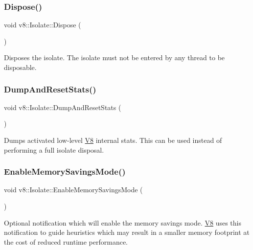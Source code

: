 \subsubsection{\texorpdfstring{Dispose()}{Dispose()}}
{\footnotesize\ttfamily void v8\+::\+Isolate\+::\+Dispose (\begin{DoxyParamCaption}{ }\end{DoxyParamCaption})}

Disposes the isolate. The isolate must not be entered by any thread to be disposable. \mbox{\label{classv8_1_1Isolate_a64546846b6d7f33f464ffd2006d88b93}} 
\subsubsection{\texorpdfstring{Dump\+And\+Reset\+Stats()}{DumpAndResetStats()}}
{\footnotesize\ttfamily void v8\+::\+Isolate\+::\+Dump\+And\+Reset\+Stats (\begin{DoxyParamCaption}{ }\end{DoxyParamCaption})}

Dumps activated low-\/level \mbox{\hyperlink{classv8_1_1V8}{V8}} internal stats. This can be used instead of performing a full isolate disposal. \mbox{\label{classv8_1_1Isolate_a7d99e7ecb1518b1c38d6bf019a40dac9}} 
\subsubsection{\texorpdfstring{Enable\+Memory\+Savings\+Mode()}{EnableMemorySavingsMode()}}
{\footnotesize\ttfamily void v8\+::\+Isolate\+::\+Enable\+Memory\+Savings\+Mode (\begin{DoxyParamCaption}{ }\end{DoxyParamCaption})}

Optional notification which will enable the memory savings mode. \mbox{\hyperlink{classv8_1_1V8}{V8}} uses this notification to guide heuristics which may result in a smaller memory footprint at the cost of reduced runtime performance. \mbox{\label{classv8_1_1Isolate_a79a222a1a662d08479d5a1880c6793c5}} 

